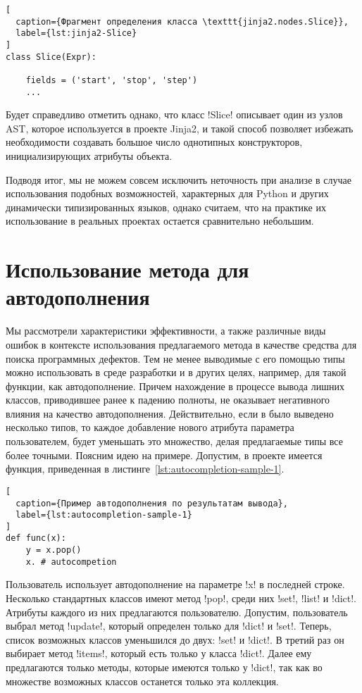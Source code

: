 \begin{lstlisting}[
  caption={Фрагмент определения класса \texttt{jinja2.nodes.Slice}},
  label={lst:jinja2-Slice}
]
class Slice(Expr):

    fields = ('start', 'stop', 'step')
    ...

\end{lstlisting}

Будет справедливо отметить однако, что класс !Slice! описывает один из узлов
AST, которое используется в проекте Jinja2, и такой способ позволяет избежать
необходимости создавать большое число однотипных конструкторов, инициализирующих
атрибуты объекта.

Подводя итог, мы не можем совсем исключить неточность при анализе в случае
использования подобных возможностей, характерных для Python и других динамически
типизированных языков, однако считаем, что на практике их использование в
реальных проектах остается сравнительно небольшим.

\section{Использование метода для автодополнения}
\label{sec:autocompletion-usage}

Мы рассмотрели характеристики эффективности, а также различные виды
ошибок в контексте использования предлагаемого метода в качестве средства для
поиска программных дефектов. Тем не менее выводимые с его помощью типы можно
использовать в среде разработки и в других целях, например, для такой функции,
как автодополнение.
Причем нахождение в процессе вывода лишних классов, приводившее ранее к падению
полноты, не оказывает негативного влияния на качество автодополнения.
Действительно, если в было выведено несколько типов, то каждое добавление
нового атрибута параметра пользователем, будет уменьшать это
множество, делая предлагаемые типы все более точными.  Поясним идею на
примере. Допустим, в проекте имеется функция, приведенная в
листинге~\ref{lst:autocompletion-sample-1}. 

\begin{lstlisting}[
  caption={Пример автодополнения по результатам вывода},
  label={lst:autocompletion-sample-1}
]
def func(x):
    y = x.pop()
    x. # autocompetion
\end{lstlisting}

Пользователь использует автодополнение на параметре !x! в последней строке.
Несколько стандартных классов имеют метод !pop!, среди них !set!, !list! и
!dict!. Атрибуты каждого из них предлагаются пользователю. Допустим,
пользователь выбрал метод !update!, который определен только для !dict! и
!set!. Теперь, список возможных классов уменьшился до двух: !set! и
!dict!. В третий раз он выбирает метод !items!, который есть только у класса
!dict!.  Далее ему предлагаются только методы, которые имеются только у !dict!,
так как во множестве возможных классов останется только эта коллекция.

